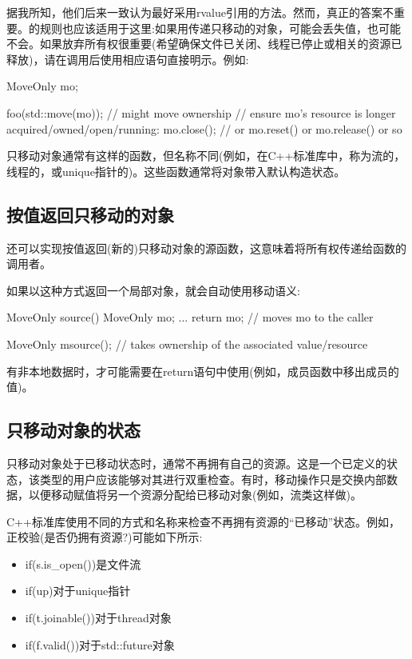 据我所知，他们后来一致认为最好采用rvalue引用的方法。然而，真正的答案不重要。的规则也应该适用于这里:如果用传递只移动的对象，可能会丢失值，也可能不会。如果放弃所有权很重要(希望确保文件已关闭、线程已停止或相关的资源已释放)，请在调用后使用相应语句直接明示。例如:

\begin{cppcode}
MoveOnly mo;

foo(std::move(mo)); // might move ownership
// ensure mo’s resource is longer acquired/owned/open/running:
mo.close(); // or mo.reset() or mo.release() or so
\end{cppcode}

只移动对象通常有这样的函数，但名称不同(例如，在C++标准库中，称为流的，线程的，或unique指针的)。这些函数通常将对象带入默认构造状态。

\subsection{按值返回只移动的对象}

还可以实现按值返回(新的)只移动对象的源函数，这意味着将所有权传递给函数的调用者。

如果以这种方式返回一个局部对象，就会自动使用移动语义:

\begin{cppcode}
MoveOnly source()
{
	MoveOnly mo;
	...
	return mo; // moves mo to the caller
}

MoveOnly m{source()}; // takes ownership of the associated value/resource
\end{cppcode}

有非本地数据时，才可能需要在return语句中使用(例如，成员函数中移出成员的值)。

\subsection{只移动对象的状态}

只移动对象处于已移动状态时，通常不再拥有自己的资源。这是一个已定义的状态，该类型的用户应该能够对其进行双重检查。有时，移动操作只是交换内部数据，以便移动赋值将另一个资源分配给已移动对象(例如，流类这样做)。

C++标准库使用不同的方式和名称来检查不再拥有资源的“已移动”状态。例如，正校验(是否仍拥有资源?)可能如下所示:

\begin{itemize}
	\item if(s.is_open())是文件流
	\item if(up)对于unique指针
	\item if(t.joinable())对于thread对象
	\item if(f.valid())对于std::future对象
\end{itemize}














